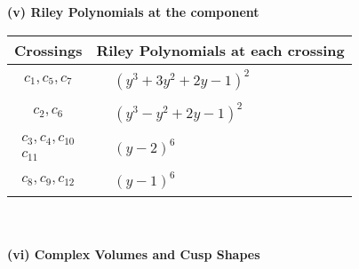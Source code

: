 \documentclass[1p]{elsarticle_modified}
\theoremstyle{definition}
\begin{document}
\newpage\renewcommand{\arraystretch}{1}
\flushleft \textbf{(v) Riley Polynomials at the component}\newline \\
\begin{tabular}{m{50pt}|m{274pt}}
Crossings & \hspace{64pt}Riley Polynomials at each crossing \\
\hline $$\begin{aligned}c_{1},c_{5},c_{7}\end{aligned}$$&$\begin{aligned}
&(y^3+3 y^2+2 y-1)^2
\end{aligned}$\\
\hline $$\begin{aligned}c_{2},c_{6}\end{aligned}$$&$\begin{aligned}
&(y^3- y^2+2 y-1)^2
\end{aligned}$\\
\hline $$\begin{aligned}c_{3},c_{4},c_{10}\\c_{11}\end{aligned}$$&$\begin{aligned}
&(y-2)^6
\end{aligned}$\\
\hline $$\begin{aligned}c_{8},c_{9},c_{12}\end{aligned}$$&$\begin{aligned}
&(y-1)^6
\end{aligned}$\\
\hline
\end{tabular}\\~\\
\newpage\flushleft \textbf{(vi) Complex Volumes and Cusp Shapes}
\end{document}
